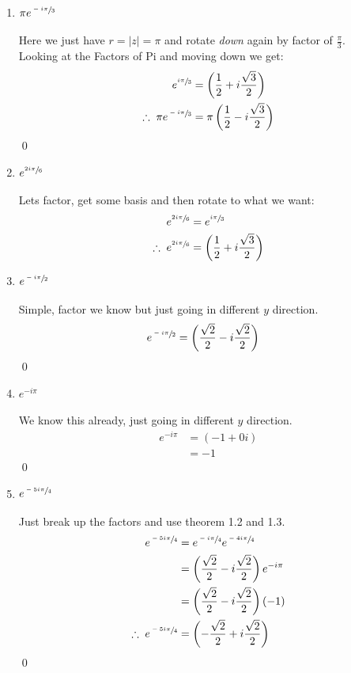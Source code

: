 \begin{enumerate}
\begin{enumerate}
		\item $\pi e^{\sfrac{-i\pi}{3}}$ \\
		\\
		Here we just have $ r = |z| = \pi$ and rotate \textit{down} again by factor of $\frac{\pi}{3}.$ \\

		Looking at the Factors of Pi and moving down we get:
		\begin{align*}
			e^{\sfrac{i\pi}{3}} &= \left( \frac{1}{2} + i\frac{\sqrt{3}}{2} \right) \\
			\therefore \; \pi e^{\sfrac{-i\pi}{3}} &= \pi \left( \frac{1}{2} - i\frac{\sqrt{3}}{2} \right) \\
		\end{align*}
		\qed


		\item $e^{\sfrac{2i\pi}{6}}$ \\
		\\
		Lets factor, get some basis and then rotate to what we want:
		\begin{align*}
			e^{\sfrac{2i\pi}{6}} &= e^{\sfrac{i\pi}{3}} \\
			\therefore \; e^{\sfrac{2i\pi}{6}} &= \left( \frac{1}{2} + i\frac{\sqrt{3}}{2} \right) \\  
		\end{align*}


		\item $e^{\sfrac{-i\pi}{2}}$ \\
		\\
		Simple, factor we know but just going in different $y$ direction.
		\begin{align*}
			e^{\sfrac{-i\pi}{2}} &= \left( \frac{\sqrt{2}}{2} - i\frac{\sqrt{2}}{2} \right)
		\end{align*}
		\qed


		\item $e^{-i\pi}$ \\
		\\
		We know this already, just going in different $y$ direction.
		\begin{align*}
			e^{-i\pi} &= \left( -1 + 0i \right) \\
			&= -1
		\end{align*}
		\qed


		\item $e^{\sfrac{-5i\pi}{4}}$ \\
		\\
		Just break up the factors and use theorem 1.2 and 1.3.
		\begin{align*}
			e^{\sfrac{-5i\pi}{4}} &= e^{\sfrac{-i\pi}{4}} e^{\sfrac{-4i\pi}{4}} \\
			&= \left( \frac{\sqrt{2}}{2} - i\frac{\sqrt{2}}{2} \right) e^{-i\pi} \\
			&= \left( \frac{\sqrt{2}}{2} - i\frac{\sqrt{2}}{2} \right) (-1) \\
			\therefore \; e^{\sfrac{-5i\pi}{4}} &= \left( -\frac{\sqrt{2}}{2} + i\frac{\sqrt{2}}{2} \right) \\
		\end{align*}
		\qed 
	\end{enumerate}
	


\end{enumerate}
